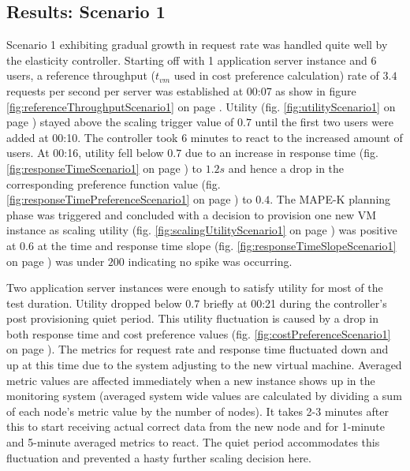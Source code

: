 \documentclass[english]{tktltiki2}
\theoremstyle{definition}
\theoremstyle{remark}
\begin{document}
\subsection{Results: Scenario 1}
\label{sec:resultsScenario1}

Scenario 1 exhibiting gradual growth in request rate was handled quite well by
the elasticity controller. Starting off with 1 application server instance and 6
users, a reference throughput ($t_{vm}$ used in cost preference calculation)
rate of $3.4$ requests per second per server was established at 00:07 as show in
figure \ref{fig:referenceThroughputScenario1} on page
\pageref{fig:referenceThroughputScenario1}. Utility (fig.
\ref{fig:utilityScenario1} on page \pageref{fig:utilityScenario1}) stayed above
the scaling trigger value of $0.7$ until the first two users were added at
00:10. The controller took 6 minutes to react to the increased amount of users.
At 00:16, utility fell below $0.7$ due to an increase in response time (fig.
\ref{fig:responseTimeScenario1} on page \pageref{fig:responseTimeScenario1}) to
$1.2 s$ and hence a drop in the corresponding preference function value (fig.
\ref{fig:responseTimePreferenceScenario1} on page
\pageref{fig:responseTimePreferenceScenario1}) to $0.4$. The MAPE-K planning
phase was triggered and concluded with a decision to provision one new VM
instance as scaling utility (fig. \ref{fig:scalingUtilityScenario1} on page
\pageref{fig:scalingUtilityScenario1}) was positive at $0.6$ at the time and
response time slope (fig. \ref{fig:responseTimeSlopeScenario1} on page
\pageref{fig:responseTimeSlopeScenario1}) was under $200$ indicating no spike
was occurring.

Two application server instances were enough to satisfy utility for most of the
test duration. Utility dropped below $0.7$ briefly at 00:21 during the
controller's post provisioning quiet period. This utility fluctuation is caused
by a drop in both response time and cost preference values (fig.
\ref{fig:costPreferenceScenario1} on page
\pageref{fig:costPreferenceScenario1}). The metrics for request rate and
response time fluctuated down and up at this time due to the system adjusting to
the new virtual machine. Averaged metric values are affected immediately when a
new instance shows up in the monitoring system (averaged system wide values are
calculated by dividing a sum of each node's metric value by the number of
nodes). It takes 2-3 minutes after this to start receiving actual correct data
from the new node and for 1-minute and 5-minute averaged metrics to react. The
quiet period accommodates this fluctuation and prevented a hasty further scaling
decision here.
\end{document}
